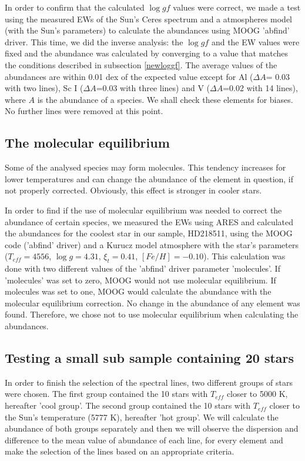 \documentclass[dvips,12pt,a4paper]{report}
\begin{document}
{In order to confirm that the calculated $\log gf$ values were correct, we made a test using the measured EWs of the Sun's Ceres spectrum and a \citet{Kurucz-1993} atmospheres model (with the Sun's parameters) to calculate the abundances using MOOG 'abfind' driver. This time, we did the inverse analysis: the $\log gf$ and the EW values were fixed and the abundance was calculated by converging to a value that matches the conditions described in subsection \ref{newloggf}. The average values of the abundances are within 0.01 dex of the expected value except for Al ($\Delta A$= 0.03 with two lines), Sc I ($\Delta A$=0.03 with three lines) and V ($\Delta A$=0.02 with 14 lines), where $A$ is the abundance of a species. We shall check these elements for biases. No further lines were removed at this point. %

\subsection {The molecular equilibrium}

Some of the analysed species may form molecules. This tendency increases for lower temperatures and can change the abundance of the element in question, if not properly corrected. Obviously, this effect is stronger in cooler stars.

In order to find if the use of molecular equilibrium was needed to correct the abundance of certain species, we measured the EWs using ARES and calculated the abundances for the coolest star in our sample, HD218511, using the MOOG code ('abfind' driver) and a Kurucz model atmosphere with the star's parameters ($T_{eff}=4556$, $\log g=4.31$, $\xi_t=0.41$, $[Fe/H]=-0.10$).  This calculation was done with two different values of the 'abfind' driver parameter 'molecules'. If 'molecules' was set to zero, MOOG would not use molecular equilibrium. If molecules was set to one, MOOG would calculate the abundance with the molecular equilibrium correction. No change in the abundance of any element was found. Therefore, we chose not to use molecular equilibrium when calculating the abundances.

\subsection {Testing a small sub sample containing 20 stars} 
\label{20stars}
In order to finish the selection of the spectral lines, two different groups of stars were chosen. The first group contained the 10 stars with $T_{eff}$ closer to 5000 K, hereafter 'cool group'. The second group contained the 10 stars with $T_{eff}$ closer to the Sun's temperature (5777 K), hereafter 'hot group'. We will calculate the abundance of both groups separately and then we will observe the dispersion and difference to the mean value of abundance of each line, for every element and make the selection of the lines based on an appropriate criteria. %

}
\end{document}
